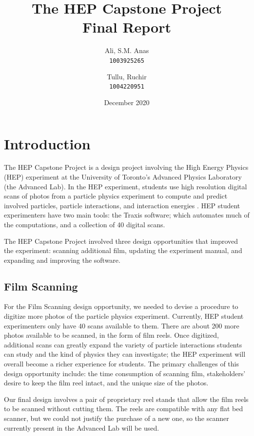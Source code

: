 \documentclass[12pt]{article} %
\title{The HEP Capstone Project \\
    \large Final Report}
\author{
    Ali, S.M. Anas\\
    \texttt{1003925265}
    \and
    Tullu, Ruchir\\
    \texttt{1004220951}}
\date{December 2020}
\begin{document}
\maketitle
\newpage

\tableofcontents
\newpage

\section{Introduction}
The HEP Capstone Project is a design project involving the High Energy Physics (HEP) experiment at the University of Toronto's Advanced Physics Laboratory (the Advanced Lab). In the HEP experiment, students use high resolution digital scans of photos from a particle physics experiment to compute and predict involved particles, particle interactions, and interaction energies \cite{aplhep}. HEP student experimenters have two main tools: the Traxis software; which automates much of the computations, and a collection of 40 digital scans.

The HEP Capstone Project involved three design opportunities that improved the experiment: scanning additional film, updating the experiment manual, and expanding and improving the software.

\subsection{Film Scanning}
For the Film Scanning design opportunity, we needed to devise a procedure to digitize more photos of the particle physics experiment. Currently, HEP student experimenters only have 40 scans available to them. There are about 200 more photos available to be scanned, in the form of film reels. Once digitized, additional scans can greatly expand the variety of particle interactions students can study and the kind of physics they can investigate; the HEP experiment will overall become a richer experience for students. The primary challenges of this design opportunity include: the time consumption of scanning film, stakeholders' desire to keep the film reel intact, and the unique size of the photos.

Our final design involves a pair of proprietary reel stands that allow the film reels to be scanned without cutting them. The reels are compatible with any flat bed scanner, but we could not justify the purchase of a new one, so the scanner currently present in the Advanced Lab will be used.
\end{document}
